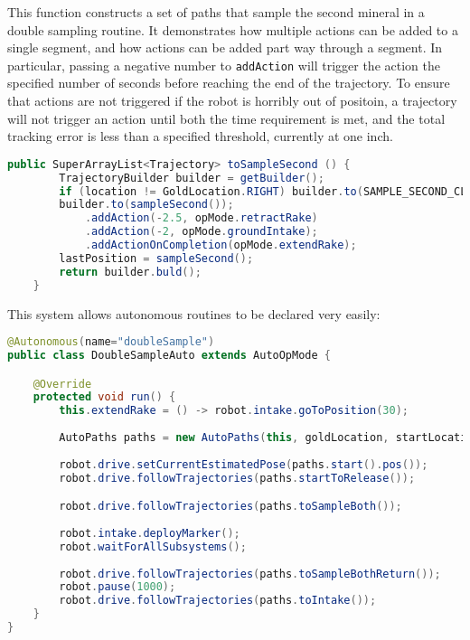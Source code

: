 \documentclass{article}
\begin{document}
This function constructs a set of paths that sample the second mineral in a double sampling routine. It demonstrates how multiple actions can be added to a single segment, and how actions can be added part way through a segment. In particular, passing a negative number to \texttt{addAction} will trigger the action the specified number of seconds before reaching the end of the trajectory. To ensure that actions are not triggered if the robot is horribly out of positoin, a trajectory will not trigger an action until both the time requirement is met, and the total tracking error is less than a specified threshold, currently at one inch. 
\begin{lstlisting}[language=Java]
    public SuperArrayList<Trajectory> toSampleSecond () {
        TrajectoryBuilder builder = getBuilder();
        if (location != GoldLocation.RIGHT) builder.to(SAMPLE_SECOND_CLEAR);
        builder.to(sampleSecond());
            .addAction(-2.5, opMode.retractRake)
            .addAction(-2, opMode.groundIntake);
            .addActionOnCompletion(opMode.extendRake);
        lastPosition = sampleSecond();
        return builder.buld();
    }
\end{lstlisting}

This system allows autonomous routines to be declared very easily:
\begin{lstlisting}[language=Java]
@Autonomous(name="doubleSample")
public class DoubleSampleAuto extends AutoOpMode {

    @Override
    protected void run() {
        this.extendRake = () -> robot.intake.goToPosition(30);
        
        AutoPaths paths = new AutoPaths(this, goldLocation, startLocation);
        
        robot.drive.setCurrentEstimatedPose(paths.start().pos());
        robot.drive.followTrajectories(paths.startToRelease());

        robot.drive.followTrajectories(paths.toSampleBoth());
        
        robot.intake.deployMarker();
        robot.waitForAllSubsystems();
        
        robot.drive.followTrajectories(paths.toSampleBothReturn());
        robot.pause(1000);
        robot.drive.followTrajectories(paths.toIntake());
    }
}

\end{lstlisting}
\end{document}
